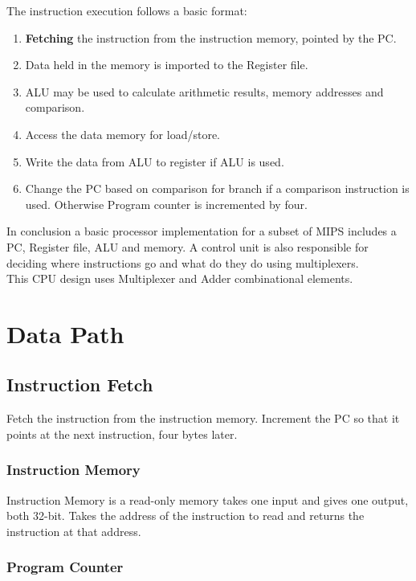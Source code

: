 \documentclass[11pt,a4paper,twocolumn]{book}
\begin{document}
The instruction execution follows a basic format:

\begin{enumerate}
\item \textbf{Fetching} the instruction from the instruction memory, pointed by the PC.
\item Data held in the memory is imported to the Register file.
\item ALU may be used to calculate arithmetic results, memory addresses and comparison.
\item Access the data memory for load/store.
\item Write the data from ALU to register if ALU is used.
\item Change the PC based on comparison for branch if a comparison instruction is used. Otherwise Program counter is incremented by four.
\end{enumerate}

In conclusion a basic processor implementation for a subset of MIPS includes a PC, Register file, ALU and memory. A control unit is also responsible for deciding where instructions go and what do they do using multiplexers.\\

This CPU design uses Multiplexer and Adder combinational elements.\\

\section{Data Path}

\subsection{Instruction Fetch}

Fetch the instruction from the instruction memory. Increment the PC so that it points at the next instruction, four bytes later.

\subsubsection{Instruction Memory}

Instruction Memory is a read-only memory takes one input and gives one output, both 32-bit. Takes the address of the instruction to read and returns the instruction at that address.

\subsubsection{Program Counter}
\end{document}
